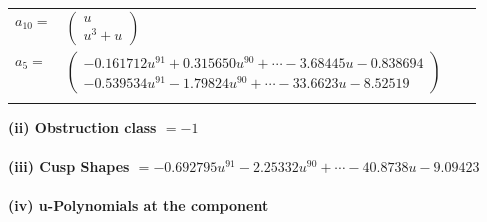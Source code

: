 \documentclass[1p]{elsarticle_modified}
\theoremstyle{definition}
\begin{document}
\begin{tabular}{m{7pt} m{180pt} m{7pt} m{180pt} }
\flushright $a_{10}=$&$\begin{pmatrix}u\\u^3+u\end{pmatrix}$ \\
\flushright $a_{5}=$&$\begin{pmatrix}-0.161712 u^{91}+0.315650 u^{90}+\cdots-3.68445 u-0.838694\\-0.539534 u^{91}-1.79824 u^{90}+\cdots-33.6623 u-8.52519\end{pmatrix}$\\&\end{tabular}
\flushleft \textbf{(ii) Obstruction class $= -1$}\\~\\
\flushleft \textbf{(iii) Cusp Shapes $= -0.692795 u^{91}-2.25332 u^{90}+\cdots-40.8738 u-9.09423$}\\~\\
\newpage\renewcommand{\arraystretch}{1}
\flushleft \textbf{(iv) u-Polynomials at the component}\newline \\
\end{document}
